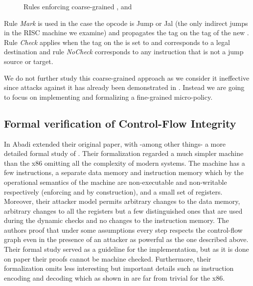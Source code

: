 \begin{figure}[htb!]
\bigskip

\bigskip

\caption{Rules enforcing coarse-grained \CFI, \NXD and \NWC}
\end{figure}

Rule \emph{Mark} is used in the case the opcode is Jump or Jal (the
only indirect jumps in the RISC machine we examine) and propagates the
\MARKname tag on the tag of the new \pc. Rule \emph{Check} applies
when the tag on the \pc is set to \MARKname and corresponds to a legal
destination and rule \emph{NoCheck} corresponds to any instruction
that is not a jump source or target.

We do not further study this coarse-grained approach as we consider it
ineffective since attacks against it has already been demonstrated in
\cite{outofcontrol_ieeesp2014}. Instead we are going to focus on
implementing and formalizing a fine-grained \CFI micro-policy.


\subsection{Formal verification of Control-Flow Integrity}\label{sec:cfi_verif}

In \cite{AbadiBEL09} Abadi \ETAL extended their original paper, with
-among other things- a more detailed formal study of \CFI. Their
formalization regarded a much simpler machine than the x86 omitting
all the complexity of modern systems. The machine has a few
instructions, a separate data memory and instruction memory which by
the operational semantics of the machine are non-executable and
non-writable respectively (enforcing \NXD and \NWC by construction),
and a small set of registers. Moreover, their attacker model permits
arbitrary changes to the data memory, arbitrary changes to all the
registers but a few distinguished ones that are used during the
dynamic checks and no changes to the instruction memory.  The authors
proof that under some assumptions every step respects the control-flow
graph even in the presence of an attacker as powerful as the one
described above. Their formal study served as a guideline for the
implementation, but as it is done on paper their proofs cannot be
machine checked. Furthermore, their formalization omits less
interesting but important details such as instruction encoding and
decoding which as shown in \cite{MorrisettTTTG12} are far from trivial
for the x86.

